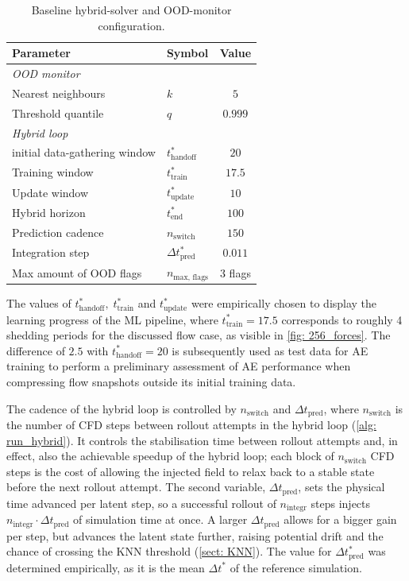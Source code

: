 \begin{table}[H]
    \centering
    \begin{tabular}{@{}llc@{}}
        \toprule
        Parameter & Symbol & Value \\
        \midrule
        \multicolumn{3}{l}{\textit{OOD monitor}} \\
        Nearest neighbours        & $k$       & $5$ \\
        Threshold quantile        & $q$       & $0.999$ \\
        \midrule
        \multicolumn{3}{l}{\textit{Hybrid loop}} \\
        initial data-gathering window   & $t_\text{handoff}^*$ & $20$ \\
        Training window & $t_\text{train}^*$     & $17.5$ \\ %
        Update window   & $t_\text{update}^*$    & $10$ \\
        Hybrid horizon            & $t_\text{end}^*$     & $100$ \\
        Prediction cadence        & $n_\text{switch}$       & $150$  \\
        Integration step          & $\Delta t^*_\text{pred}$ & $0.011$ \\
        Max amount of OOD flags   & $n_\text{max, flags}$        & $3$ flags \\
        \bottomrule
    \end{tabular}
     \caption{Baseline hybrid-solver and OOD-monitor configuration.}
    \label{tab: 4_hybrid_config}
\end{table}

The values of $t^*_\text{handoff}, \; t^*_\text{train}$ and $ t^*_\text{update}$ were empirically chosen to display the learning progress of the ML pipeline, where $t^*_\text{train} = 17.5$ corresponds to roughly 4 shedding periods for the discussed flow case, as visible in \autoref{fig: 256_forces}. The difference of $2.5$ with $t^*_\text{handoff} = 20$ is subsequently used as test data for AE training to perform a preliminary assessment of AE performance when compressing flow snapshots outside its initial training data. 

The cadence of the hybrid loop is controlled by $n_\text{switch}$ and $\Delta t_\text{pred}$, where $n_\text{switch}$ is the number of CFD steps between rollout attempts in the hybrid loop (\autoref{alg: run_hybrid}). It controls the stabilisation time between rollout attempts and, in effect, also the achievable speedup of the hybrid loop; each block of $n_\text{switch}$ CFD steps is the cost of allowing the injected field to relax back to a stable state before the next rollout attempt. The second variable, $\Delta t_\text{pred}$, sets the physical time advanced per latent step, so a successful rollout of $n_\text{integr}$ steps injects $n_\text{integr}\!\cdot\!\Delta t_\text{pred}$ of simulation time at once. A larger $\Delta t_\text{pred}$ allows for a bigger gain per step, but advances the latent state further, raising potential drift and the chance of crossing the KNN threshold (\autoref{sect: KNN}). The value for $\Delta t^*_\text{pred}$ was determined empirically, as it is the mean $\Delta t^*$ of the reference simulation. 


